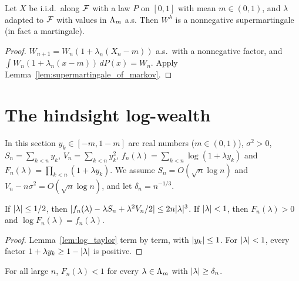 \begin{lemma}
  \label{lem:wealth_supermartingale}
  \leanok
  Let $X$ be i.i.d.\ along $\mathcal{F}$ with a law $P$ on $[0,1]$ with mean $m \in (0,1)$, and $\lambda$
  adapted to $\mathcal{F}$ with values in $\Lambda_m$ a.s. Then $W^\lambda$ is a nonnegative supermartingale (in
  fact a martingale).
\end{lemma}

\begin{proof}
  \leanok
  $W_{n+1} = W_n (1 + \lambda_n(X_n - m))$ a.s.\ with a nonnegative factor, and
  $\int W_n(1 + \lambda_n(x - m)) \, dP(x) = W_n$. Apply Lemma~\ref{lem:supermartingale_of_markov}.
\end{proof}

\section{The hindsight log-wealth}

In this section $y_k \in [-m, 1-m]$ are real numbers ($m \in (0,1)$), $\sigma^2 > 0$,
$S_n = \sum_{k<n} y_k$, $V_n = \sum_{k<n} y_k^2$, $f_n(\lambda) = \sum_{k<n} \log(1 + \lambda y_k)$
and $F_n(\lambda) = \prod_{k<n}(1 + \lambda y_k)$. We assume $S_n = O(\sqrt n \log n)$ and $V_n -
n\sigma^2 = O(\sqrt n \log n)$, and let $\delta_n = n^{-1/3}$.

\begin{lemma}
  \label{lem:hindsight_quadratic}
  \leanok
  If $\lvert \lambda \rvert \le 1/2$, then $\lvert f_n(\lambda) - \lambda S_n + \lambda^2 V_n/2 \rvert \le 2 n
  \lvert \lambda \rvert^3$. If $\lvert \lambda \rvert < 1$, then $F_n(\lambda) > 0$ and $\log F_n(\lambda) =
  f_n(\lambda)$.
\end{lemma}

\begin{proof}
  \leanok
  Lemma~\ref{lem:log_taylor} term by term, with $\lvert y_k \rvert \le 1$. For $\lvert \lambda \rvert < 1$, every
  factor $1 + \lambda y_k \ge 1 - \lvert \lambda \rvert$ is positive.
\end{proof}

\begin{lemma}
  \label{lem:hindsight_neg}
  \leanok
  For all large $n$, $F_n(\lambda) < 1$ for every $\lambda \in \Lambda_m$ with $\lvert \lambda \rvert \ge \delta_n$.
\end{lemma}

